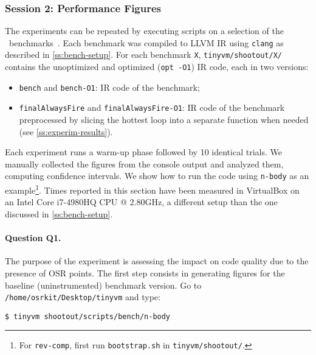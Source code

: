 
\subsubsection{Session 2: Performance Figures}

The experiments can be repeated by executing scripts on a selection of the \shootout\ benchmarks~\cite{shootout}. Each benchmark was compiled to LLVM IR using {\tt clang} as described in \mysection\ref{ss:bench-setup}. For each benchmark {\tt X}, {\small\tt tinyvm/shootout/X/} contains the unoptimized and optimized ({\tt opt -O1}) IR code, each in two versions:

\begin{itemize}[parsep=0pt]
\item {\tt bench} and {\tt bench-O1}: IR code of the benchmark;
\item {\tt finalAlwaysFire} and {\tt finalAlwaysFire-O1}: IR code of the benchmark preprocessed by slicing the hottest loop into a separate function when needed (see \ref{ss:experim-results}).
\end{itemize}

\noindent Each experiment runs a warm-up phase followed by 10 identical trials. We manually collected the figures from the console output and analyzed them, computing confidence intervals. We show how to run the code using {\tt n-body} as an example\footnote{For {\tt rev-comp}, first run {\tt bootstrap.sh} in {\tt tinyvm/shootout/}. }. Times reported in this section have been measured in VirtualBox on an Intel Core i7-4980HQ CPU @ 2.80GHz, a different setup than the one discussed in \ref{ss:bench-setup}.

\paragraph{Question Q1.} The purpose of the experiment is assessing the impact on code quality due to the presence of OSR points.
The first step consists in generating figures for the baseline (uninstrumented) benchmark version. Go to {\small\tt /home/osrkit/Desktop/tinyvm} and type:
\begin{small}
\begin{verbatim}
$ tinyvm shootout/scripts/bench/n-body
\end{verbatim}
\end{small}

